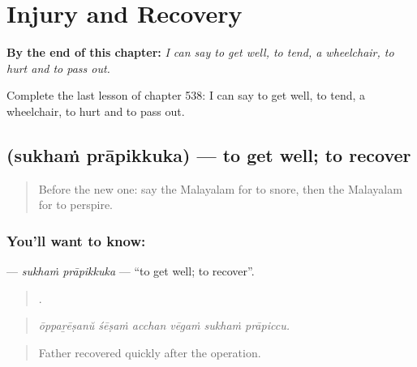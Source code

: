 
\chapter{Injury and Recovery}
\label{ch:ml-injury-and-recovery}

\begin{chapteropening}
\textbf{By the end of this chapter:} \emph{I can say to get well, to tend, a wheelchair, to hurt and to pass out.}

Complete the last lesson of chapter 538: I can say to get well, to tend, a wheelchair, to hurt and to pass out.
\end{chapteropening}

\section[\texorpdfstring{\ml{സുഖം} \ml{പ്രാപിക്കുക} (sukhaṁ prāpikkuka)}{സുഖം പ്രാപിക്കുക (sukhaṁ prāpikkuka)}]{  (sukhaṁ prāpikkuka) — to get well; to recover}

\label{lesson:ML-C538-sukham-prapikkuka}



\begin{quote}
Before the new one: say the Malayalam for to snore, then the Malayalam for to perspire.
\end{quote}

\subsection*{You'll want to know:  }
\textbf{ } — \emph{sukhaṁ prāpikkuka} — \textquotedblleft{}to get well; to recover\textquotedblright{}.

\begin{quote}
     .
\end{quote}

\begin{quote}
\emph{ōppaṟēṣanŭ śēṣaṁ acchan vēgaṁ sukhaṁ prāpiccu.}
\end{quote}

\begin{quote}
Father recovered quickly after the operation.
\end{quote}

